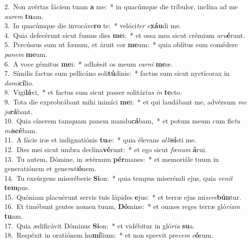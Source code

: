 {2.~}Non avértas fáciem tuam \textbf{a} me:~* in quacúmque die tríbulor, inclína ad me \textit{au}\textit{rem} \textbf{tu}am.\\
{3.~}In quacúmque die invocáve\textbf{ro} te:~* velóci\textit{ter} \textit{e}\textbf{xáu}di me.\\
{4.~}Quia defecérunt sicut fumus dies \textbf{me}i:~* et ossa mea sicut crémium \textit{a}\textit{ru}\textbf{é}runt.\\
{5.~}Percússus sum ut fœnum, et áruit cor \textbf{me}um:~* quia oblítus sum comédere \textit{pa}\textit{nem} \textbf{me}um.\\
{6.~}A voce gémitus \textbf{me}i:~* adhǽsit os meum \textit{car}\textit{ni} \textbf{me}æ.\\
{7.~}Símilis factus sum pellicáno soli\textbf{tú}dinis:~* factus sum sicut nyctícorax in \textit{do}\textit{mi}\textbf{cí}lio.\\
{8.~}Vigi\textbf{lá}vi,~* et factus sum sicut passer solitári\textit{us} \textit{in} \textbf{te}cto.\\
{9.~}Tota die exprobrábant mihi inimíci \textbf{me}i:~* et qui laudábant me, advérsum \textit{me} \textit{ju}\textbf{rá}bant.\\
{10.~}Quia cínerem tamquam panem mandu\textbf{cá}bam,~* et potum meum cum fle\textit{tu} \textit{mi}\textbf{scé}bam.\\
{11.~}A fácie iræ et indignatiónis \textbf{tu}æ:~* quia élevans \textit{al}\textit{li}\textbf{sí}sti me.\\
{12.~}Dies mei sicut umbra declina\textbf{vé}runt:~* et ego sicut \textit{fœ}\textit{num} \textbf{á}rui.\\
{13.~}Tu autem, Dómine, in ætérnum \textbf{pér}manes:~* et memoriále tuum in generatiónem et gene\textit{ra}\textit{ti}\textbf{ó}nem.\\
{14.~}Tu exsúrgens miseréberis \textbf{Si}on:~* quia tempus miseréndi ejus, quia \textit{ve}\textit{nit} \textbf{tem}pus.\\
{15.~}Quóniam placuérunt servis tuis lápides \textbf{e}jus:~* et terræ ejus mi\textit{se}\textit{re}\textbf{bún}tur.\\
{16.~}Et timébunt gentes nomen tuum, \textbf{Dó}mine:~* et omnes reges terræ gló\textit{ri}\textit{am} \textbf{tu}am.\\
{17.~}Quia ædificávit Dóminus \textbf{Si}on:~* et vidébitur in gló\textit{ri}\textit{a} \textbf{su}a.\\
{18.~}Respéxit in oratiónem hu\textbf{mí}lium:~* et non sprevit pre\textit{cem} \textit{e}\textbf{ó}rum.\\
